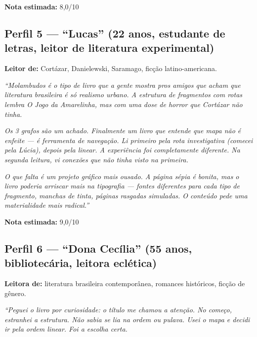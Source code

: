 \documentclass[14pt,openany]{extbook}
\begin{document}
\vspace{0.3em}
\noindent\textbf{Nota estimada:} 8,0/10

\vspace{0.8em}

\subsection*{Perfil 5 --- ``Lucas'' (22 anos, estudante de letras, leitor de literatura experimental)}

\textbf{Leitor de:} Cortázar, Danielewski, Saramago, ficção latino-americana.

\vspace{0.3em}
\noindent\textit{``Molambudos é o tipo de livro que a gente mostra pros amigos que acham que literatura brasileira é só realismo urbano. A estrutura de fragmentos com rotas lembra O Jogo da Amarelinha, mas com uma dose de horror que Cortázar não tinha.}

\vspace{0.3em}
\noindent\textit{Os 3 grafos são um achado. Finalmente um livro que entende que mapa não é enfeite --- é ferramenta de navegação. Li primeiro pela rota investigativa (comecei pela Lúcia), depois pela linear. A experiência foi completamente diferente. Na segunda leitura, vi conexões que não tinha visto na primeira.}

\vspace{0.3em}
\noindent\textit{O que falta é um projeto gráfico mais ousado. A página sépia é bonita, mas o livro poderia arriscar mais na tipografia --- fontes diferentes para cada tipo de fragmento, manchas de tinta, páginas rasgadas simuladas. O conteúdo pede uma materialidade mais radical.''}

\vspace{0.3em}
\noindent\textbf{Nota estimada:} 9,0/10

\vspace{0.8em}

\subsection*{Perfil 6 --- ``Dona Cecília'' (55 anos, bibliotecária, leitora eclética)}

\textbf{Leitora de:} literatura brasileira contemporânea, romances históricos, ficção de gênero.

\vspace{0.3em}
\noindent\textit{``Peguei o livro por curiosidade: o título me chamou a atenção. No começo, estranhei a estrutura. Não sabia se lia na ordem ou pulava. Usei o mapa e decidi ir pela ordem linear. Foi a escolha certa.}
\end{document}
